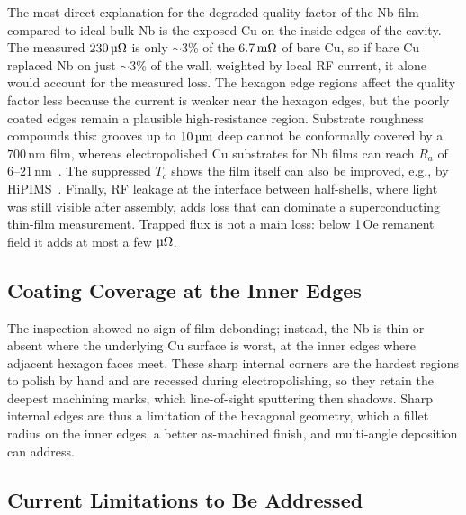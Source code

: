 \documentclass[letterpaper,journal]{IEEEtran}
\newcommand{\SI}[2]{\ensuremath{#1\,\text{#2}}}
\newcommand{\si}[1]{\ensuremath{\text{#1}}}
\newcommand{\SIrange}[3]{\ensuremath{#1\text{--}#2\,\text{#3}}}
\newcommand{\meter}{m}
\newcommand{\ohm}{\ensuremath{\Omega}}
\newcommand{\milli}{m}
\newcommand{\micro}{\textmu}
\newcommand{\nano}{n}
\begin{document}
The most direct explanation for the degraded quality factor of the Nb film compared to ideal bulk Nb is the exposed Cu on the inside edges of the cavity. The measured \SI{230}{\micro\ohm} is only $\sim$3\% of the \SI{6.7}{\milli\ohm} of bare Cu, so if bare Cu replaced Nb on just $\sim$3\% of the wall, weighted by local RF current, it alone would account for the measured loss. The hexagon edge regions affect the quality factor less because the current is weaker near the hexagon edges, but the poorly coated edges remain a plausible high-resistance region. Substrate roughness compounds this: grooves up to \SI{10}{\micro\meter} deep cannot be conformally covered by a \SI{700}{\nano\meter} film, whereas electropolished Cu substrates for Nb films can reach $R_a$ of \SIrange{6}{21}{\nano\meter}~\cite{Pira2019CuPolish}. The suppressed $T_c$ shows the film itself can also be improved, e.g., by HiPIMS~\cite{leithHiPIMSNbCu2023}. Finally, RF leakage at the interface between half-shells, where light was still visible after assembly, adds loss that can dominate a superconducting thin-film measurement. Trapped flux is not a main loss: below 1\,Oe remanent field it adds at most a few \si{\micro\ohm}.

\subsection{Coating Coverage at the Inner Edges}

The inspection showed no sign of film debonding; instead, the Nb is thin or absent where the underlying Cu surface is worst, at the inner edges where adjacent hexagon faces meet. These sharp internal corners are the hardest regions to polish by hand and are recessed during electropolishing, so they retain the deepest machining marks, which line-of-sight sputtering then shadows. Sharp internal edges are thus a limitation of the hexagonal geometry, which a fillet radius on the inner edges, a better as-machined finish, and multi-angle deposition can address.

\subsection{Current Limitations to Be Addressed}
\end{document}
